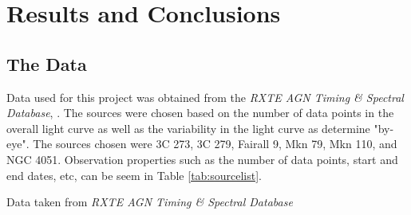 \documentclass[12pt, oneside]{smuthesis}
\begin{document}
\chapter{\sc Results and Conclusions} \label{resultsConclusions}

\section{\sc The Data} \label{theData}

Data used for this project was obtained from the \textit{RXTE AGN Timing \& Spectral Database}, \cite{rxtepaper}. The sources were chosen based on the number of data points in the overall light curve as well as the variability in the light curve as determine "by-eye". The sources chosen were 3C 273, 3C 279, Fairall 9, Mkn 79, Mkn 110, and NGC 4051. Observation properties such as the number of data points, start and end dates, etc, can be seem in Table \ref{tab:sourcelist}. 

\begin{minipage}{\linewidth}
	\centering
	\label{tab:sourcelist}
	\par
	\bigskip
	Data taken from \textit{RXTE AGN Timing \& Spectral Database}
\end{minipage}
\end{document}

